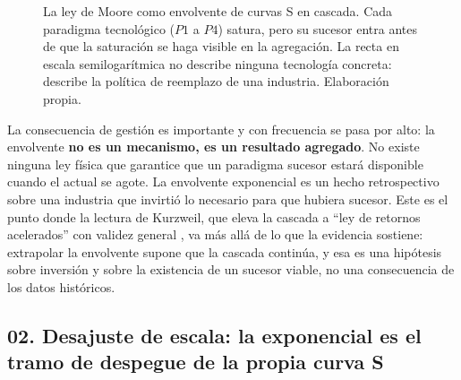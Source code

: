 \documentclass[11pt,letterpaper]{article}
\begin{document}
\begin{figure}[ht]
  \centering
  \caption{La ley de Moore como envolvente de curvas S en cascada. Cada
  paradigma tecnológico ($P1$ a $P4$) satura, pero su sucesor entra antes de que
  la saturación se haga visible en la agregación. La recta en escala
  semilogarítmica no describe ninguna tecnología concreta: describe la política
  de reemplazo de una industria. Elaboración propia.}
  \label{fig:envolvente}
\end{figure}

La consecuencia de gestión es importante y con frecuencia se pasa por alto: la
envolvente \textbf{no es un mecanismo, es un resultado agregado}. No existe
ninguna ley física que garantice que un paradigma sucesor estará disponible
cuando el actual se agote. La envolvente exponencial es un hecho retrospectivo
sobre una industria que invirtió lo necesario para que hubiera sucesor. Este es
el punto donde la lectura de Kurzweil, que eleva la cascada a \enquote{ley de
retornos acelerados} con validez general \parencite{kurzweil2005}, va más allá de
lo que la evidencia sostiene: extrapolar la envolvente supone que la cascada
continúa, y esa es una hipótesis sobre inversión y sobre la existencia de un
sucesor viable, no una consecuencia de los datos históricos.

\subsection*{02. Desajuste de escala: la exponencial es el tramo de despegue de
la propia curva S}
\end{document}
